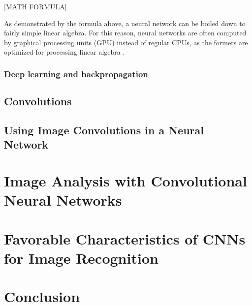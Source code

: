 \documentclass[12pt,a4paper,titlepage]{article}
\begin{document}
[MATH FORMULA]

As demonstrated by the formula above, a neural network can be boiled down to fairly simple linear algebra. For this reason, neural networks are often computed by graphical processing units (GPU) instead of regular CPUs, as the formers are optimized for processing linear algebra \cite{salter_cart_2022}.

\subsubsection{Deep learning and backpropagation}


\subsection{Convolutions}

\subsection{Using Image Convolutions in a Neural Network}

\section{Image Analysis with Convolutional Neural Networks}

\section{Favorable Characteristics of CNNs for Image Recognition}

\section{Conclusion}

\clearpage
\begin{flushleft}


\end{flushleft}
\end{document}
